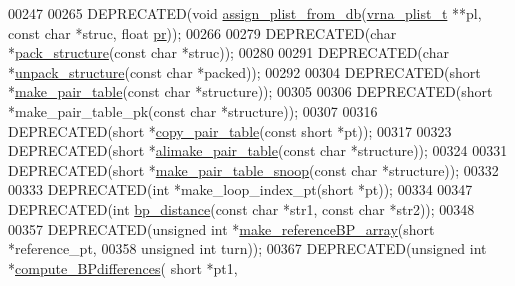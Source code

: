 \begin{DoxyCode}
00247 
00265 DEPRECATED(\textcolor{keywordtype}{void} \hyperlink{group__struct__utils_ga6f3031d77de925a7b4ca72e1d52dec2f}{assign\_plist\_from\_db}(\hyperlink{group__data__structures_structvrna__plist__s}{vrna\_plist\_t} **pl, \textcolor{keyword}{const} \textcolor{keywordtype}{char} *struc, \textcolor{keywordtype}{
      float} \hyperlink{fold__vars_8h_ac98ec419070aee6831b44e5c700f090f}{pr}));
00266 
00279 DEPRECATED(\textcolor{keywordtype}{char} *\hyperlink{group__struct__utils_gac6dfa5e22928c087c6e09ff0054a7ced}{pack\_structure}(\textcolor{keyword}{const} \textcolor{keywordtype}{char} *struc));
00280 
00291 DEPRECATED(\textcolor{keywordtype}{char} *\hyperlink{group__struct__utils_ga071c6921efe1eb974f115ee6fefa3c39}{unpack\_structure}(\textcolor{keyword}{const} \textcolor{keywordtype}{char} *packed));
00292 
00304 DEPRECATED(\textcolor{keywordtype}{short} *\hyperlink{group__struct__utils_ga89c32307ee50a0026f4a3131fac0845a}{make\_pair\_table}(\textcolor{keyword}{const} \textcolor{keywordtype}{char} *structure));
00305 
00306 DEPRECATED(\textcolor{keywordtype}{short} *make\_pair\_table\_pk(\textcolor{keyword}{const} \textcolor{keywordtype}{char} *structure));
00307 
00316 DEPRECATED(\textcolor{keywordtype}{short} *\hyperlink{group__struct__utils_gafeaa6d68eef3a99d0a7aa08aa91c6601}{copy\_pair\_table}(\textcolor{keyword}{const} \textcolor{keywordtype}{short} *pt));
00317 
00323 DEPRECATED(\textcolor{keywordtype}{short} *\hyperlink{group__struct__utils_ga3c81b3967056c3888b8472b65fbb16f5}{alimake\_pair\_table}(\textcolor{keyword}{const} \textcolor{keywordtype}{char} *structure));
00324 
00331 DEPRECATED(\textcolor{keywordtype}{short} *\hyperlink{group__struct__utils_ga9aa3bf3b4346bb7fb88efc154dd07a79}{make\_pair\_table\_snoop}(\textcolor{keyword}{const} \textcolor{keywordtype}{char} *structure));
00332 
00333 DEPRECATED(\textcolor{keywordtype}{int} *make\_loop\_index\_pt(\textcolor{keywordtype}{short} *pt));
00334 
00347 DEPRECATED(\textcolor{keywordtype}{int} \hyperlink{group__struct__utils_ga6ebbcd29a754f0e4f1a66d1fd84184db}{bp\_distance}(\textcolor{keyword}{const} \textcolor{keywordtype}{char} *str1, \textcolor{keyword}{const} \textcolor{keywordtype}{char} *str2));
00348 
00357 DEPRECATED(\textcolor{keywordtype}{unsigned} \textcolor{keywordtype}{int}  *\hyperlink{group__struct__utils_ga578cd9712dee812fb1c58aa3cc489864}{make\_referenceBP\_array}(\textcolor{keywordtype}{short} *reference\_pt,
00358                                       \textcolor{keywordtype}{unsigned} \textcolor{keywordtype}{int} turn));
00367 DEPRECATED(\textcolor{keywordtype}{unsigned} \textcolor{keywordtype}{int}  *\hyperlink{group__struct__utils_gadd463184355d0803b6ee6e09f29182f2}{compute\_BPdifferences}( \textcolor{keywordtype}{short} *pt1,

\end{DoxyCode}
